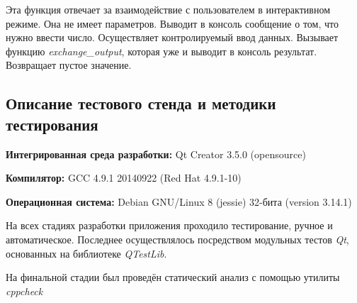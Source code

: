 \documentclass[12pt,a4paper]{report}
\begin{document}
\begin{enumerate}
\begin{itemize}
Эта функция отвечает за взаимодействие с пользователем в интерактивном режиме. Она не имеет параметров. Выводит в консоль сообщение о том, что нужно ввести число. Осуществляет контролируемый ввод данных. Вызывает функцию \textit{exchange\_output}, которая уже и выводит в консоль результат. Возвращает пустое значение.
\end{itemize}
\end{enumerate}
\subsection{Описание тестового стенда и методики тестирования}

\begin{flushleft}
\textbf{Интегрированная среда разработки:} Qt Creator 3.5.0 (opensource)

\textbf{Компилятор:} GCC 4.9.1 20140922 (Red Hat 4.9.1-10)

\textbf{Операционная система:} Debian GNU/Linux 8 (jessie) 32-бита (version 3.14.1)
\end{flushleft}

На всех стадиях разработки приложения проходило тестирование, ручное и автоматическое. Последнее осуществлялось посредством модульных тестов \textit{Qt}, основанных на библиотеке  \textit{QTestLib}.

На финальной стадии был проведён статический анализ с помощью утилиты \textit{cppcheck}%
\end{document}

